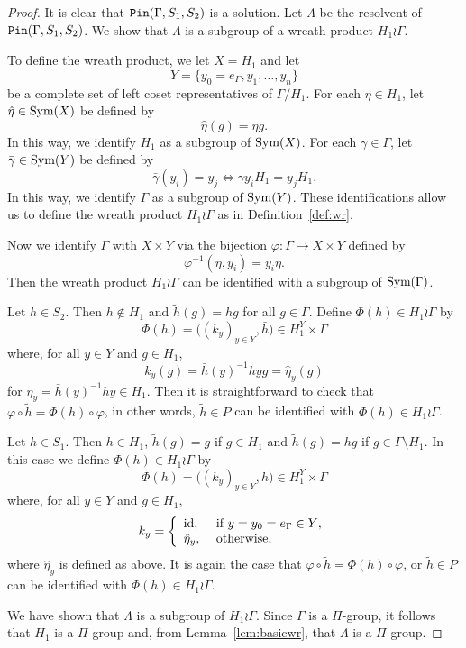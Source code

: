\documentclass[11pt]{amsart}
\theoremstyle{definition}
\theoremstyle{definition}
\numberwithin{equation}{section}
\begin{document}
\begin{proof} It is clear that $\mbox{\tt Pin} (\Gamma, S_1, S_2)$ is a solution. Let $\Lambda$ be the resolvent of $\mbox{\tt Pin} (\Gamma, S_1, S_2)$. We show that $\Lambda$ is a subgroup of a wreath product $H_1\wr \Gamma$. 

To define the wreath product, we let $X=H_1$ and let $$Y=\{y_0=e_\Gamma, y_1, \dots, y_n\}$$ be a complete set of left coset representatives of $\Gamma/H_1$. For each $\eta\in H_1$, let $\hat{\eta}\in \mbox{\rm Sym}(X)$ be defined by 
$$ \hat{\eta}(g)=\eta g. $$
In this way, we identify $H_1$ as a subgroup of $\mbox{\rm Sym}(X)$.  For each $\gamma\in \Gamma$, let $\bar{\gamma}\in \mbox{\rm Sym}(Y)$ be defined by
$$ \bar{\gamma}(y_i)=y_j \iff \gamma y_iH_1=y_j H_1. $$
In this way, we identify $\Gamma$ as a subgroup of $\mbox{\rm Sym}(Y)$. These identifications allow us to define the wreath product $H_1\wr \Gamma$ as in Definition~\ref{def:wr}.

Now we identify $\Gamma$ with $X\times Y$ via the bijection $\varphi\colon \Gamma\to X\times Y$ defined by
$$ \varphi^{-1}(\eta, y_i)=y_i\eta. $$
Then the wreath product $H_1\wr \Gamma$ can be identified with a subgroup of $\mbox{\rm Sym}(\Gamma)$. 

Let $h\in S_2$. Then $h\not\in H_1$ and $\tilde{h}(g)=hg$ for all $g\in \Gamma$. Define $\Phi(h)\in H_1\wr \Gamma$ by 
$$ \Phi(h)=\big((k_y)_{y\in Y}, \bar{h}\big)\in H_1^Y\times \Gamma $$
where, for all $y\in Y$ and $g\in H_1$,
$$ k_y(g)=\bar{h}(y)^{-1}hyg=\hat{\eta}_y(g)  $$
for $\eta_y=\bar{h}(y)^{-1}hy\in H_1$. 
Then it is straightforward to check that $\varphi\circ \tilde{h}=\Phi(h)\circ \varphi$, in other words, $\tilde{h}\in P$ can be identified with $\Phi(h)\in H_1\wr \Gamma$.

Let $h\in S_1$. Then $h\in H_1$, $\tilde{h}(g)=g$ if $g\in H_1$ and $\tilde{h}(g)=hg$ if $g\in \Gamma\setminus H_1$. In this case we define $\Phi(h)\in H_1\wr \Gamma$ by
$$ \Phi(h)=\big((k_y)_{y\in Y}, \bar{h}\big)\in H_1^Y\times \Gamma $$
where, for all $y\in Y$ and $g\in H_1$, 
$$ k_y=\left\{\begin{array}{ll} \mbox{\rm id}, & \mbox{ if $y=y_0=e_\Gamma\in Y$,} \\ \hat{\eta}_y, & \mbox{ otherwise}, \end{array}\right. $$
where $\hat{\eta}_y$ is defined as above. It is again the case that $\varphi\circ \tilde{h}=\Phi(h)\circ \varphi$, or $\tilde{h}\in P$ can be identified with $\Phi(h)\in H_1\wr\Gamma$.  

We have shown that $\Lambda$ is a subgroup of $H_1\wr \Gamma$. Since $\Gamma$ is a $\Pi$-group, it follows that $H_1$ is a $\Pi$-group and, from Lemma~\ref{lem:basicwr}, that $\Lambda$ is a $\Pi$-group. 
\end{proof}
\end{document}
